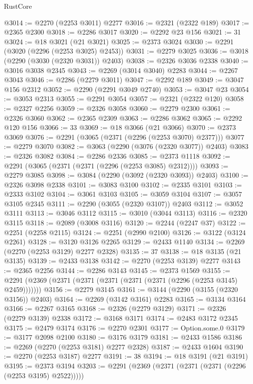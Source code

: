 \begin{lexlean}{RustCore}
\begin{coremodule}
@3014 := @2270 (@2253 @3011) @2277
@3016 := @2321 (@2322 @189)
@3017 := @2365 @2300
@3018 := @2286 @3017
@3020 := @2292 @23 @156
@3021 := 31
@3024 := @18 @3021 (@21 @3021)
@3025 := @2373 @3024
@3030 := @2291 (@3020 (@2296 (@2253 @3025) @2453))
@3031 := @2279 @3025
@3036 := @3018 (@2290 (@3030 (@2320 @3031)) @2403)
@3038 := @2326 @3036 @2338
@3040 := @3016 @3038 @2345
@3043 := @2269 (@3014 @3040) @2283
@3044 := @2267 @3043
@3046 := @2286 (@2279 @3011)
@3047 := @2292 @189
@3049 := @3047 @156 @2312
@3052 := @2290 (@2291 @3049 @2740)
@3053 := @3047 @23
@3054 := @3053 @2313
@3055 := @2291 @3054
@3057 := @2321 (@2322 @120)
@3058 := @2327 @2256
@3059 := @2326 @3058
@3060 := @2279 @2300
@3061 := @2326 @3060
@3062 := @2365 @2309
@3063 := @2286 @3062
@3065 := @2292 @120 @156
@3066 := 33
@3069 := @18 @3066 (@21 @3066)
@3070 := @2373 @3069
@3076 := @2291 (@3065 (@2371 (@2296 (@2253 @3070) @2377)))
@3077 := @2279 @3070
@3082 := @3063 (@2290 (@3076 (@2320 @3077)) @2403)
@3083 := @2326 @3082
@3084 := @2286 @2336
@3085 := @2373 @1118
@3092 := @2291 (@3065 (@2371 (@2371 (@2296 (@2253 @3085) @2312))))
@3093 := @2279 @3085
@3098 := @3084 (@2290 (@3092 (@2320 @3093)) @2403)
@3100 := @2326 @3098 @2338
@3101 := @3083 @3100
@3102 := @2335 @3101
@3103 := @2333 @3102
@3104 := @3061 @3103
@3105 := @3059 @3104
@3107 := @3057 @3105 @2345
@3111 := @2290 (@3055 (@2320 @3107)) @2403
@3112 := @3052 @3111
@3113 := @3046 @3112
@3115 := @3010 (@3044 @3113)
@3116 := @2320 @3115
@3118 := @2089 (@3008 @3116)
@3120 := @2244 (@2247 @37)
@3122 := @2251 (@2258 @2115)
@3124 := @2251 (@2990 @2100)
@3126 := @3122 (@3124 @2261)
@3128 := @3120 @3126 @2265
@3129 := @2433 @1140
@3134 := @2269 (@2270 (@2253 @3129) @2277 @2328)
@3135 := 37
@3138 := @18 @3135 (@21 @3135)
@3139 := @2433 @3138
@3142 := @2270 (@2253 @3139) @2277
@3143 := @2365 @2256
@3144 := @2286 @3143
@3145 := @2373 @1569
@3155 := @2291 (@2369 (@2371 (@2371 (@2371 (@2371 (@2371 (@2296 (@2253 @3145) @2459)))))))
@3156 := @2279 @3145
@3161 := @3144 (@2290 (@3155 (@2320 @3156)) @2403)
@3164 := @2269 (@3142 @3161) @2283
@3165 := @3134 @3164
@3166 := @2267 @3165
@3168 := @2326 (@2279 @3129)
@3171 := @2326 (@2279 @3139) @2338
@3172 := @3168 @3171
@3174 := @2483 @3172 @2345
@3175 := @2479 @3174
@3176 := @2270 @2301
@3177 := Option.some.{0}
@3179 := @3177 @2098 @2100
@3180 := @3176 @3179
@3181 := @2433 @1586
@3186 := @2269 (@2270 (@2253 @3181) @2277 @2328)
@3187 := @2433 @1604
@3190 := @2270 (@2253 @3187) @2277
@3191 := 38
@3194 := @18 @3191 (@21 @3191)
@3195 := @2373 @3194
@3203 := @2291 (@2369 (@2371 (@2371 (@2371 (@2296 (@2253 @3195) @2522)))))

\end{coremodule}
\end{lexlean}

